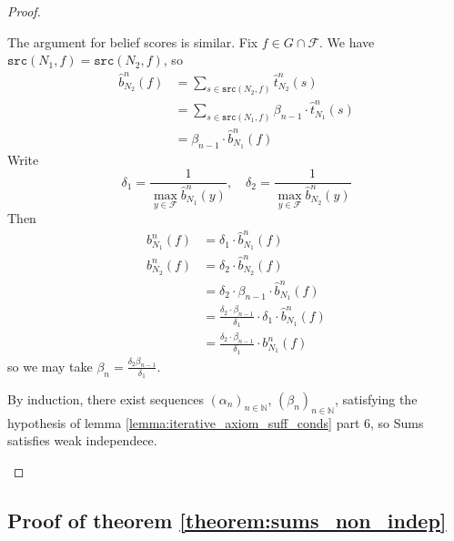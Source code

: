 \documentclass{article}
\theoremstyle{definition} \newtheorem{definition}{Definition}
\theoremstyle{definition} \newtheorem{example}{Example}
\theoremstyle{plain} \newtheorem{axiom}{Axiom}
\theoremstyle{plain} \newtheorem*{remark}{Remark}
\theoremstyle{remark} \newtheorem*{notation}{Notation}
\theoremstyle{plain} \newtheorem{lemma}{Lemma}
\theoremstyle{plain} \newtheorem{theorem}{Theorem}
\theoremstyle{plain} \newtheorem{proposition}{Proposition}
\newcommand{\F}{\mathcal{F}}
\newcommand{\Nat}{\mathbb{N}}
\newcommand{\src}{\texttt{src}}
\begin{document}
\begin{proof}
\begin{enumerate}
The argument for belief scores is similar. Fix $f \in G \cap \F$. We have
$\src(N_1, f) = \src(N_2, f)$, so
\begin{align*}
    \hat{b}_{N_2}^n(f) & = \sum_{s \in \src(N_2, f)}{\hat{t}_{N_2}^n(s)} \\
       & = \sum_{s \in \src(N_1, f)}{\beta_{n-1} \cdot \hat{t}_{N_1}^n(s)} \\
       & = \beta_{n-1} \cdot \hat{b}_{N_1}^n(f)
\end{align*}
Write
\[
    \delta_1 = \frac{1}{\max\limits_{y \in \F}{\hat{b}_{N_1}^n(y)}},
    \quad
    \delta_2 = \frac{1}{\max\limits_{y \in \F}{\hat{b}_{N_2}^n(y)}}
\]
Then
\begin{align*}
    b_{N_1}^n(f) & = \delta_1 \cdot \hat{b}_{N_1}^n(f) \\
    b_{N_2}^n(f) & = \delta_2 \cdot \hat{b}_{N_2}^n(f) \\
     & = \delta_2 \cdot \beta_{n - 1} \cdot \hat{b}_{N_1}^n(f) \\
     & = \frac{\delta_2 \cdot \beta_{n - 1}}{\delta_1} \cdot \delta_1 \cdot \hat{b}_{N_1}^n(f) \\
     & = \frac{\delta_2 \cdot \beta_{n - 1}}{\delta_1} \cdot b_{N_1}^n(f)
\end{align*}
so we may take $\beta_n = \frac{\delta_2\beta_{n-1}}{\delta_1}$.

By induction, there exist sequences $(\alpha_n)_{n \in \Nat}$, $(\beta_n)_{n
\in \Nat}$, satisfying the hypothesis of lemma
\ref{lemma:iterative_axiom_suff_conds} part 6, so Sums satisfies weak
independece.

\end{enumerate}

\end{proof}

\subsection{Proof of theorem \ref{theorem:sums_non_indep}}
\end{document}
